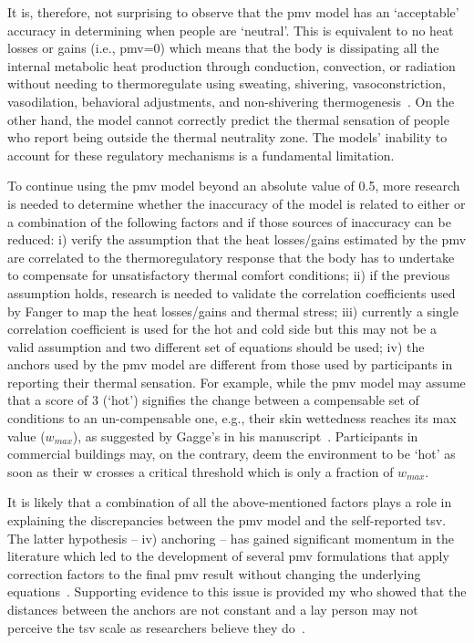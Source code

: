 It is, therefore, not surprising to observe that the \ac{pmv} model has an `acceptable' accuracy in determining when people are `neutral'.
This is equivalent to no heat losses or gains (i.e., \ac{pmv}=0) which means that the body is dissipating all the internal metabolic heat production through conduction, convection, or radiation without needing to thermoregulate using sweating, shivering, vasoconstriction, vasodilation, behavioral adjustments, and non-shivering thermogenesis~\cite{ romanovsky_thermoregulation_2018}.
On the other hand, the model cannot correctly predict the thermal sensation of people who report being outside the thermal neutrality zone.
The models' inability to account for these regulatory mechanisms is a fundamental limitation.

To continue using the \ac{pmv} model beyond an absolute value of \num{0.5}, more research is needed to determine whether the inaccuracy of the model is related to either or a combination of the following factors and if those sources of inaccuracy can be reduced:
i) verify the assumption that the heat losses/gains estimated by the \ac{pmv} are correlated to the thermoregulatory response that the body has to undertake to compensate for unsatisfactory thermal comfort conditions;
ii) if the previous assumption holds, research is needed to validate the correlation coefficients used by Fanger to map the heat losses/gains and thermal stress;
iii) currently a single correlation coefficient is used for the hot and cold side but this may not be a valid assumption and two different set of  equations should be used;
iv) the anchors used by the \ac{pmv} model are different from those used by participants in reporting their thermal sensation.
For example, while the \ac{pmv} model may assume that a score of 3 (`hot') signifies the change between a compensable set of conditions to an un-compensable one, e.g., their skin wettedness reaches its max value ($w_{max}$), as suggested by Gagge's in his manuscript~\cite{GaggeSET}.
Participants in commercial buildings may, on the contrary, deem the environment to be `hot' as soon as their \ac{w} crosses a critical threshold which is only a fraction of $w_{max}$.

It is likely that a combination of all the above-mentioned factors plays a role in explaining the discrepancies between the \ac{pmv} model and the self-reported \ac{tsv}.
The latter hypothesis -- iv) anchoring -- has gained significant momentum in the literature which led to the development of several \ac{pmv} formulations that apply correction factors to the final \ac{pmv} result without changing the underlying equations~\cite{Yao2022, Toftum2002}.
Supporting evidence to this issue is provided my  who showed that the distances between the anchors are not constant and a lay person may not perceive the \ac{tsv} scale as researchers believe they do~\cite{schweiker2019scales, schweiker2020evaluating}.


